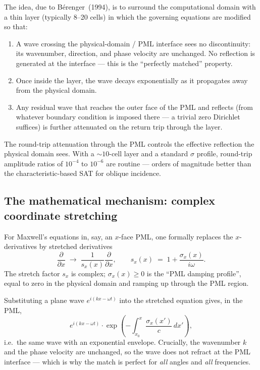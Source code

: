 \documentclass[11pt]{article}
\begin{document}
The idea, due to B\'erenger~(1994), is to surround the computational
domain with a thin layer (typically 8--20 cells) in which the
governing equations are modified so that:

\begin{enumerate}
  \item A wave crossing the physical-domain / PML interface sees no
        discontinuity: its wavenumber, direction, and phase velocity
        are unchanged. No reflection is generated at the interface
        — this is the ``perfectly matched'' property.
  \item Once inside the layer, the wave decays exponentially as it
        propagates away from the physical domain.
  \item Any residual wave that reaches the outer face of the PML
        and reflects (from whatever boundary condition is imposed
        there — a trivial zero Dirichlet suffices) is further
        attenuated on the return trip through the layer.
\end{enumerate}

The round-trip attenuation through the PML controls the effective
reflection the physical domain sees. With a $\sim 10$-cell layer and
a standard $\sigma$ profile, round-trip amplitude ratios of $10^{-4}$
to $10^{-6}$ are routine — orders of magnitude better than the
characteristic-based SAT for oblique incidence.

\subsection{The mathematical mechanism: complex coordinate stretching}

For Maxwell's equations in, say, an $x$-face PML, one formally
replaces the $x$-derivatives by stretched derivatives
\begin{equation}
  \frac{\partial}{\partial x} \;\longrightarrow\;
  \frac{1}{s_x(x)} \frac{\partial}{\partial x},
  \qquad
  s_x(x) \;=\; 1 + \frac{\sigma_x(x)}{i \omega}.
  \label{eq:pml-stretch}
\end{equation}
The stretch factor $s_x$ is complex; $\sigma_x(x) \geq 0$ is the
``PML damping profile'', equal to zero in the physical domain and
ramping up through the PML region.

Substituting a plane wave $e^{i(k x - \omega t)}$ into the stretched
equation gives, in the PML,
\[
  e^{i (k x - \omega t)} \cdot \exp\!\left( -\int_{x_0}^{x}
  \frac{\sigma_x(x')}{c} \, dx' \right),
\]
i.e.\ the same wave with an exponential envelope. Crucially, the
wavenumber $k$ and the phase velocity are unchanged, so the wave does
not refract at the PML interface — which is why the match is perfect
for \emph{all} angles and \emph{all} frequencies.
\end{document}
